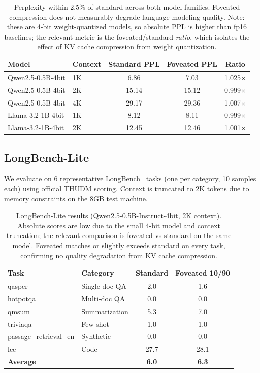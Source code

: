 \documentclass{article}
\begin{document}
\begin{table}[h]
\centering
\begin{tabular}{llccc}
\toprule
Model & Context & Standard PPL & Foveated PPL & Ratio \\
\midrule
Qwen2.5-0.5B-4bit & 1K & 6.86 & 7.03 & 1.025$\times$ \\
Qwen2.5-0.5B-4bit & 2K & 15.14 & 15.12 & 0.999$\times$ \\
Qwen2.5-0.5B-4bit & 4K & 29.17 & 29.36 & 1.007$\times$ \\
Llama-3.2-1B-4bit & 1K & 8.12 & 8.11 & 0.999$\times$ \\
Llama-3.2-1B-4bit & 2K & 12.45 & 12.46 & 1.001$\times$ \\
\bottomrule
\end{tabular}
\caption{Perplexity within 2.5\% of standard across both model families.
Foveated compression does not measurably degrade language modeling
quality. Note: these are 4-bit weight-quantized models, so absolute PPL
is higher than fp16 baselines; the relevant metric is the
foveated/standard \emph{ratio}, which isolates the effect of KV cache
compression from weight quantization.}
\label{tab:ppl}
\end{table}

\subsection{LongBench-Lite}

We evaluate on 6 representative LongBench~\cite{longbench} tasks (one
per category, 10 samples each) using official THUDM scoring. Context is
truncated to 2K tokens due to memory constraints on the 8GB test
machine.

\begin{table}[h]
\centering
\begin{tabular}{llcc}
\toprule
Task & Category & Standard & Foveated 10/90 \\
\midrule
qasper & Single-doc QA & 2.0 & 1.6 \\
hotpotqa & Multi-doc QA & 0.0 & 0.0 \\
qmsum & Summarization & 5.3 & 7.0 \\
triviaqa & Few-shot & 1.0 & 1.0 \\
passage\_retrieval\_en & Synthetic & 0.0 & 0.0 \\
lcc & Code & 27.7 & 28.1 \\
\textbf{Average} & & \textbf{6.0} & \textbf{6.3} \\
\bottomrule
\end{tabular}
\caption{LongBench-Lite results (Qwen2.5-0.5B-Instruct-4bit, 2K
context). Absolute scores are low due to the small 4-bit model and
context truncation; the relevant comparison is foveated vs standard on
the same model. Foveated matches or slightly exceeds standard on every
task, confirming no quality degradation from KV cache compression.}
\label{tab:longbench}
\end{table}
\end{document}
